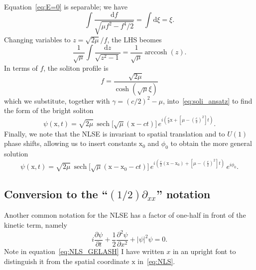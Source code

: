 \documentclass[11pt,a4paper]{article}
\DeclareMathOperator{\arccosh}{arccosh}
\DeclareMathOperator{\sech}{sech}
\begin{document}
Equation~\eqref{eq:E=0} is separable; we have
\begin{equation*}
	\int\! \frac{\mathrm{d}f}{\sqrt{\mu f^2 - f^4/2}} = \int\! \mathrm{d}\xi = \xi.
\end{equation*}
Changing variables to $z=\sqrt{2\mu}/f$, the LHS beomes
\begin{equation*}
	\frac{1}{\sqrt{\mu}} \int\! \frac{\mathrm{d} z}{\sqrt{z^2-1}} = \frac{1}{\sqrt{\mu}} \arccosh(z).
\end{equation*}
In terms of $f$, the soliton profile is
\begin{equation*}
	f = \frac{\sqrt{2\mu}}{\cosh(\sqrt{\mu}\xi)}
\end{equation*}
which we substitute, together with $\gamma = (c/2)^2 - \mu$, into~\eqref{eq:soli_ansatz} to find the form of the bright soliton
\begin{equation*}
	\psi(\mathrm{x},t) 
		=  \sqrt{2\mu} \, \sech\!\big[\sqrt{\mu}(\mathrm{x}-ct)\big]  \, 
			e^{i\left(\frac{c}{2}\mathrm{x}+\left[\mu- \left(\frac{c}{2}\right)^2\right]t \right) }.
\end{equation*}
Finally, we note that the NLSE is invariant to spatial translation and to $U(1)$ phase shifts, allowing us to insert constants $\mathrm{x}_0$ and $\phi_0$ to obtain the more general solution
\begin{equation}
	\label{eq:soliton_plus_consts}
	\psi(\mathrm{x},t) = \sqrt{2\mu} \, \sech\!\big[\sqrt{\mu}(\mathrm{x}-\mathrm{x}_0-ct)\big]  \, e^{i\left( \frac{c}{2}(\mathrm{x}-\mathrm{x}_0) + \left[\mu-\left(\frac{c}{2}\right)^2\right] t \right) } \, e^{i\phi_0}.
\end{equation}



\subsection{Conversion to the ``$(1/2)\partial_{xx}$'' notation}
\label{subsec:Gelash_notation}
 
Another common notation for the NLSE has a factor of one-half in front of the kinetic term, namely
\begin{equation}
	\label{eq:NLS_GELASH}
		i\frac{\partial \psi}{\partial t} + \frac{1}{2}\frac{\partial^2 \psi}{\partial x^2} + |\psi|^2 \psi =0.
\end{equation}
Note in equation~\eqref{eq:NLS_GELASH} I have written $x$ in an upright font to distinguish it from the spatial coordinate $\mathrm{x}$ in~\eqref{eq:NLS}. 
\end{document}
